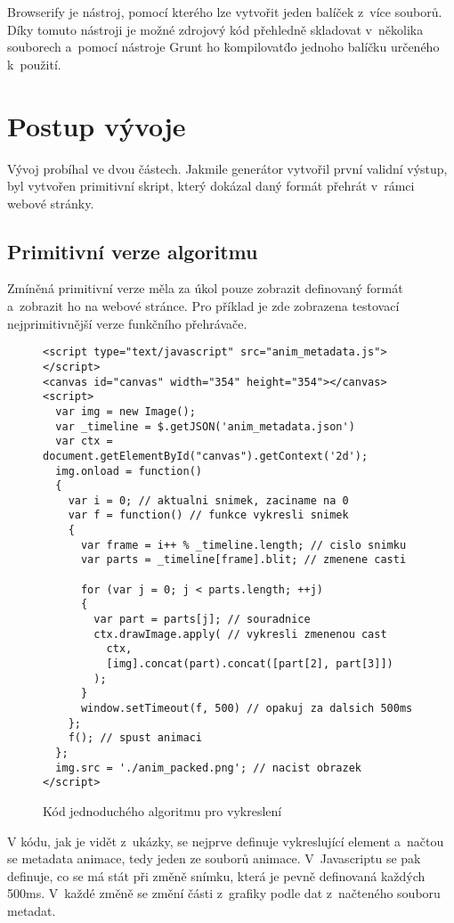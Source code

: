 Browserify je nástroj, pomocí kterého lze vytvořit jeden balíček z~více souborů. Díky tomuto nástroji je možné zdrojový kód přehledně skladovat v~několika souborech a~pomocí nástroje Grunt ho \"kompilovat\" do jednoho balíčku určeného k~použití. 



\section{Postup vývoje}

Vývoj probíhal ve dvou částech. Jakmile generátor vytvořil první validní výstup, byl vytvořen primitivní skript, který dokázal daný formát přehrát v~rámci webové stránky.

\subsection{Primitivní verze algoritmu}

Zmíněná primitivní verze měla za úkol pouze zobrazit definovaný formát a~zobrazit ho na webové stránce. Pro příklad je zde zobrazena testovací nejprimitivnější verze funkčního přehrávače.

\begin{figure}[h!]
\caption{Kód jednoduchého algoritmu pro vykreslení}
\begin{lstlisting}
<script type="text/javascript" src="anim_metadata.js"></script>
<canvas id="canvas" width="354" height="354"></canvas>
<script>
  var img = new Image();
  var _timeline = $.getJSON('anim_metadata.json')
  var ctx = document.getElementById("canvas").getContext('2d');
  img.onload = function()
  {
    var i = 0; // aktualni snimek, zaciname na 0
    var f = function() // funkce vykresli snimek
    {
      var frame = i++ % _timeline.length; // cislo snimku
      var parts = _timeline[frame].blit; // zmenene casti

      for (var j = 0; j < parts.length; ++j)
      {
        var part = parts[j]; // souradnice
        ctx.drawImage.apply( // vykresli zmenenou cast
          ctx,
          [img].concat(part).concat([part[2], part[3]])
        );
      }
      window.setTimeout(f, 500) // opakuj za dalsich 500ms
    };
    f(); // spust animaci
  };
  img.src = './anim_packed.png'; // nacist obrazek
</script>
\end{lstlisting}
\end{figure}
\FloatBarrier

V kódu, jak je vidět z~ukázky, se nejprve definuje vykreslující element a~načtou se metadata animace, tedy jeden ze souborů animace. V~Javascriptu se pak definuje, co se má stát při změně snímku, která je pevně definovaná každých 500ms. V~každé změně se změní části z~grafiky podle dat z~načteného souboru metadat. 


